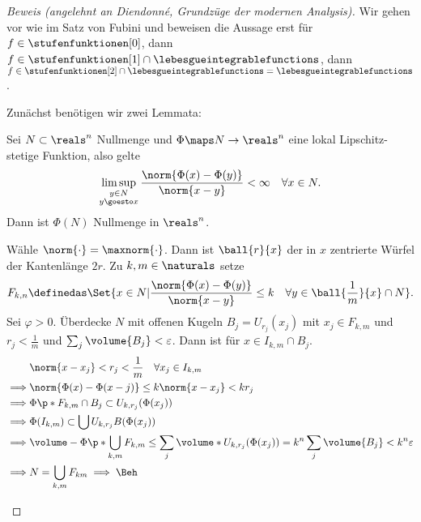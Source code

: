\begin{proof}[Beweis (angelehnt an Diendonné, Grundzüge der modernen Analysis)]
  Wir gehen vor wie im Satz von Fubini und beweisen die Aussage erst für \( f\in \stufenfunktionen[0] \), dann \( f\in \stufenfunktionen[1]\cap \lebesgueintegrablefunctions \), dann \( f\in \stufenfunktionen[2]\cap \lebesgueintegrablefunctions=\lebesgueintegrablefunctions \).
  
  Zunächst benötigen wir zwei Lemmata:
  \begin{lemma}\label{lipschitz_stetige_funktion_bild_von_nullmenge_ist_nullmenge}
    Sei \( N\subset \reals^n \) Nullmenge und \( \Phi\maps N\to \reals^n \) eine lokal Lipschitz-stetige Funktion, also gelte
    \begin{equation*}
      \limsup_{\substack{y\in N\\ y\goesto x}}\frac{\norm{\Phi(x)-\Phi(y)}}{\norm{x-y}}<\infty\quad \forall x\in N.
    \end{equation*}
    Dann ist \( \Phi(N) \) Nullmenge in \( \reals^n \).
  \end{lemma}
  \begin{subproof}
    Wähle \( \norm{\cdot}=\maxnorm{\cdot} \). Dann ist \( \ball{r}{x} \) der in \( x \) zentrierte Würfel der Kantenlänge \( 2r \). Zu \( k, m\in \naturals \) setze
    \begin{equation*}
      F_{k,n}\definedas \Set{x\in N|\frac{\norm{\Phi(x)-\Phi(y)}}{\norm{x-y}}\leq k\quad \forall y\in \ball{\frac{1}{m}}{x}\cap N}.
    \end{equation*}
    Sei \( \varphi>0 \). Überdecke \( N \) mit offenen Kugeln \( B_j=U_{r_j}(x_j) \) mit \( x_j\in F_{k,m} \) und \( r_j<\frac{1}{m} \) und \( \sum_{j}\volume{B_j}<\varepsilon \). Dann ist für \( x\in I_{k,m}\cap B_j \).
    \begin{align*}
      &\norm{x-x_j}<r_j<\frac{1}{m}\quad \forall x_j\in I_{k,m}\\
      \implies &\norm{\Phi(x)-\Phi(x-j)}\leq k\norm{x-x_j}<k r_j\\
      \implies &\Phi\p*{F_{k,m}\cap B_j}\subset U_{k,r_j}(\Phi(x_j))\\
      \implies &\Phi(I_{k,m})\subset \bigcup U_{k,r_j} B(\Phi(x_j))\\
      \implies &\volume-{\Phi\p*{\bigcup_{k,m}F_{k,m}}}\leq \sum_{j}\volume*{U_{k,r_j}(\Phi(x_j))}=k^n \sum_{j}\volume{B_j}<k^n \varepsilon\\
      \implies &N=\bigcup_{k,m}F_{km}\implies \text{\Beh}
    \end{align*}
    

\end{subproof}
\end{proof}
